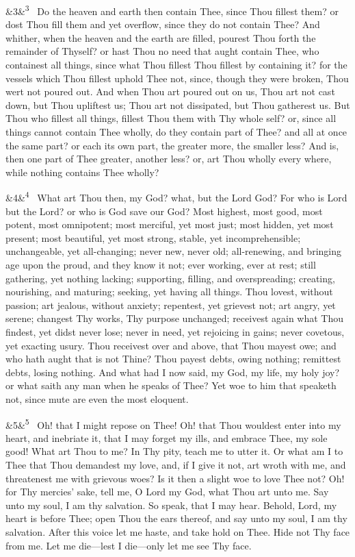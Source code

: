 \documentclass[12pt]{article}
\newcommand{\para}[1][]{\par\noindent\ifx&#1&\else\textsuperscript{\footnotesize #1}~\fi}
\begin{document}
\para[3] Do the heaven and earth then contain Thee, since Thou fillest them? or dost Thou fill them and yet overflow, since they do not contain Thee? And whither, when the heaven and the earth are filled, pourest Thou forth the remainder of Thyself? or hast Thou no need that aught contain Thee, who containest all things, since what Thou fillest Thou fillest by containing it? for the vessels which Thou fillest uphold Thee not, since, though they were broken, Thou wert not poured out. And when Thou art poured out on us, Thou art not cast down, but Thou upliftest us; Thou art not dissipated, but Thou gatherest us. But Thou who fillest all things, fillest Thou them with Thy whole self? or, since all things cannot contain Thee wholly, do they contain part of Thee? and all at once the same part? or each its own part, the greater more, the smaller less? And is, then one part of Thee greater, another less? or, art Thou wholly every where, while nothing contains Thee wholly?

\para[4] What art Thou then, my God? what, but the Lord God? For who is Lord but the Lord? or who is God save our God? Most highest, most good, most potent, most omnipotent; most merciful, yet most just; most hidden, yet most present; most beautiful, yet most strong, stable, yet incomprehensible; unchangeable, yet all-changing; never new, never old; all-renewing, and bringing age upon the proud, and they know it not; ever working, ever at rest; still gathering, yet nothing lacking; supporting, filling, and overspreading; creating, nourishing, and maturing; seeking, yet having all things. Thou lovest, without passion; art jealous, without anxiety; repentest, yet grievest not; art angry, yet serene; changest Thy works, Thy purpose unchanged; receivest again what Thou findest, yet didst never lose; never in need, yet rejoicing in gains; never covetous, yet exacting usury. Thou receivest over and above, that Thou mayest owe; and who hath aught that is not Thine? Thou payest debts, owing nothing; remittest debts, losing nothing. And what had I now said, my God, my life, my holy joy? or what saith any man when he speaks of Thee? Yet woe to him that speaketh not, since mute are even the most eloquent.

\para[5] Oh! that I might repose on Thee! Oh! that Thou wouldest enter into my heart, and inebriate it, that I may forget my ills, and embrace Thee, my sole good! What art Thou to me? In Thy pity, teach me to utter it. Or what am I to Thee that Thou demandest my love, and, if I give it not, art wroth with me, and threatenest me with grievous woes? Is it then a slight woe to love Thee not? Oh! for Thy mercies' sake, tell me, O Lord my God, what Thou art unto me. Say unto my soul, I am thy salvation. So speak, that I may hear. Behold, Lord, my heart is before Thee; open Thou the ears thereof, and say unto my soul, I am thy salvation. After this voice let me haste, and take hold on Thee. Hide not Thy face from me. Let me die---lest I die---only let me see Thy face.
\end{document}

